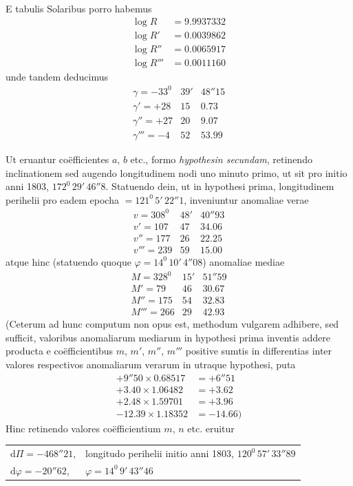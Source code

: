 E tabulis Solaribus porro habemus
\[
\begin{aligned}
\log R&=9.9937332\\
\log R'&=0.0039862\\
\log R''&=0.0065917\\
\log R'''&=0.0011160
\end{aligned}
\]
unde tandem deducimus
\[
\begin{array}{rrr}
\gamma=-33^0&39'&48''15\\
\gamma'=+28&15&0.73\\
\gamma''=+27&20&9.07\\
\gamma'''=-4&52&53.99
\end{array}
\]

Ut eruantur coëfficientes $a$, $b$ etc., formo \textit{hypothesin secundam}, retinendo inclinationem sed augendo longitudinem nodi uno minuto primo, ut sit pro initio anni 1803, $172^0\,29'\,46''8$. Statuendo dein, ut in hypothesi prima, longitudinem perihelii pro eadem epocha $=121^0\,5'\,22''1$, inveniuntur anomaliae verae
\[
\begin{array}{rrr}
v=308^0&48'&40''93\\
v'=107&47&34.06\\
v''=177&26&22.25\\
v'''=239&59&15.00
\end{array}
\]
atque hinc (statuendo quoque $\varphi=14^0\,10'\,4''08$) anomaliae mediae
\[
\begin{array}{rrr}
M=328^0&15'&51''59\\
M'=79&46&30.67\\
M''=175&54&32.83\\
M'''=266&29&42.93
\end{array}
\]
(Ceterum ad hunc computum non opus est, methodum vulgarem adhibere, sed sufficit, valoribus anomaliarum mediarum in hypothesi prima inventis addere producta e coëfficientibus $m$, $m'$, $m''$, $m'''$ positive sumtis in differentias inter valores respectivos anomaliarum verarum in utraque hypothesi, puta
\[
\begin{aligned}
+9''50\times0.68517&=+6''51\\
+3.40\times1.06482&=+3.62\\
+2.48\times1.59701&=+3.96\\
-12.39\times1.18352&=-14.66)
\end{aligned}
\]
Hinc retinendo valores coëfficientium $m$, $n$ etc. eruitur
\begin{center}\fontsize{9}{11}\selectfont\setlength{\tabcolsep}{3pt}\begin{tabular}{p{.23\linewidth}p{.70\linewidth}}
$\mathrm d\Pi=-468''21$,&longitudo perihelii initio anni 1803, $120^0\,57'\,33''89$\\
$\mathrm d\varphi=-20''62$,&$\varphi=14^0\,9'\,43''46$
\end{tabular}\end{center}
